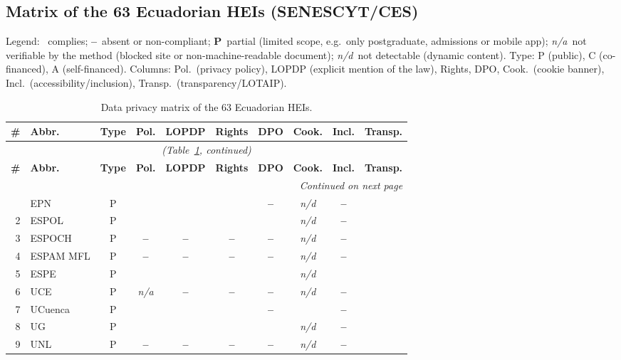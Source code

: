 \documentclass[pdflatex,sn-basic,Numbered]{sn-jnl}
\newcommand{\si}{\ding{51}}
\newcommand{\no}{\textcolor{gris}{\textbf{--}}}
\newcommand{\nv}{\textsl{\footnotesize n/a}}
\newcommand{\nd}{\textsl{\footnotesize n/d}}
\theoremstyle{thmstyleone}
\theoremstyle{thmstyletwo}
\theoremstyle{thmstylethree}
\begin{document}
\begin{appendices}
\section{Matrix of the 63 Ecuadorian HEIs (SENESCYT/CES)}\label{ap:ecuador}
Legend: \si~complies; \no~absent or non-compliant; \textbf{P}~partial (limited scope, e.g.\ only postgraduate, admissions or mobile app); \nv~not verifiable by the method (blocked site or non-machine-readable document); \nd~not detectable (dynamic content). Type: P (public), C (co-financed), A (self-financed). Columns: Pol.\ (privacy policy), LOPDP (explicit mention of the law), Rights, DPO, Cook.\ (cookie banner), Incl.\ (accessibility/inclusion), Transp.\ (transparency/LOTAIP).

\footnotesize
\begin{longtable}{@{}r l c c c c c c c c@{}}
	\caption{Data privacy matrix of the 63 Ecuadorian HEIs.}\label{tab:ecuador}\\
	\toprule
	\textbf{\#} & \textbf{Abbr.} & \textbf{Type} & \textbf{Pol.} & \textbf{LOPDP} & \textbf{Rights} & \textbf{DPO} & \textbf{Cook.} & \textbf{Incl.} & \textbf{Transp.} \\
	\midrule
	\endfirsthead
	\multicolumn{10}{c}{\textit{(Table~\ref{tab:ecuador}, continued)}}\\
	\toprule
	\textbf{\#} & \textbf{Abbr.} & \textbf{Type} & \textbf{Pol.} & \textbf{LOPDP} & \textbf{Rights} & \textbf{DPO} & \textbf{Cook.} & \textbf{Incl.} & \textbf{Transp.} \\
	\midrule
	\endhead
	\midrule
	\multicolumn{10}{r}{\textit{Continued on next page}}\\
	\endfoot
	\bottomrule
	\endlastfoot
1 & EPN & P & \si & \si & \si & \no & \nd & \no & \si \\
	2 & ESPOL & P & \si & \si & \si & \si & \nd & \no & \si \\
	3 & ESPOCH & P & \no & \no & \no & \no & \nd & \no & \si \\
	4 & ESPAM MFL & P & \no & \no & \no & \no & \nd & \no & \si \\
	5 & ESPE & P & \si & \si & \si & \si & \nd & \si & \si \\
	6 & UCE & P & \nv & \no & \no & \no & \nd & \no & \si \\
	7 & UCuenca & P & \si & \si & \si & \no & \si & \no & \si \\
	8 & UG & P & \si & \si & \si & \si & \nd & \no & \si \\
	9 & UNL & P & \no & \no & \no & \no & \nd & \no & \si \\

\end{longtable}
\end{appendices}
\end{document}
